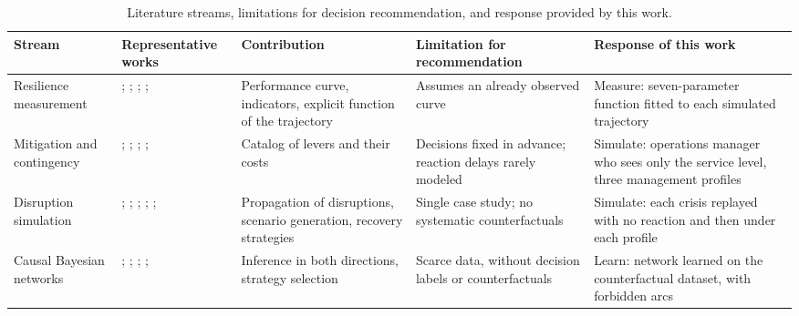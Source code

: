 \begin{table}[htbp]
\caption{Literature streams, limitations for decision recommendation, and response provided by this work.}
\label{tab:synthese}
\footnotesize
\begin{tabularx}{\textwidth}{@{}P{1.9cm}P{3.3cm}LLL@{}}
\toprule
\textbf{Stream} & \textbf{Representative works} & \textbf{Contribution} & \textbf{Limitation for recommendation} & \textbf{Response of this work} \\
\midrule
Resilience measurement
  & \citealp{bruneau2003}; \citealp{henry2012}; \citealp{spiegler2012}; \citealp{behzadi2020}; \citealp{rahiel2026in4pl}
  & Performance curve, indicators, explicit function of the trajectory
  & Assumes an already observed curve
  & Measure: seven-parameter function fitted to each simulated trajectory \\
\addlinespace
Mitigation and contingency
  & \citealp{tang2006}; \citealp{tomlin2006}; \citealp{lucker2019}; \citealp{ivanov2016tre}; \citealp{aldrighetti2021}
  & Catalog of levers and their costs
  & Decisions fixed in advance; reaction delays rarely modeled
  & Simulate: operations manager who sees only the service level, three management profiles \\
\addlinespace
Disruption simulation
  & \citealp{schmitt2012}; \citealp{ivanov2017}; \citealp{macdonald2018}; \citealp{klibi2012ejor}; \citealp{ramzy2022}; \citealp{zhang2026isomorph}
  & Propagation of disruptions, scenario generation, recovery strategies
  & Single case study; no systematic counterfactuals
  & Simulate: each crisis replayed with no reaction and then under each profile \\
\addlinespace
Causal Bayesian networks
  & \citealp{garvey2015}; \citealp{ojha2018}; \citealp{qazi2018}; \citealp{hosseiniivanov2020}; \citealp{rahiel2026codit}
  & Inference in both directions, strategy selection
  & Scarce data, without decision labels or counterfactuals
  & Learn: network learned on the counterfactual dataset, with forbidden arcs \\
\bottomrule
\end{tabularx}
\end{table}
